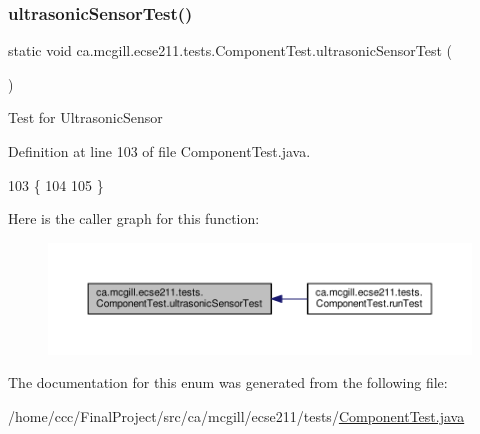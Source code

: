 \subsubsection{\texorpdfstring{ultrasonic\+Sensor\+Test()}{ultrasonicSensorTest()}}
{\footnotesize\ttfamily static void ca.\+mcgill.\+ecse211.\+tests.\+Component\+Test.\+ultrasonic\+Sensor\+Test (\begin{DoxyParamCaption}{ }\end{DoxyParamCaption})\hspace{0.3cm}{\ttfamily [static]}}

Test for Ultrasonic\+Sensor 

Definition at line 103 of file Component\+Test.\+java.


\begin{DoxyCode}
103                                             \{
104 
105   \}
\end{DoxyCode}
Here is the caller graph for this function\+:
\nopagebreak
\begin{figure}[H]
\begin{center}
\leavevmode
\includegraphics[width=350pt]{enumca_1_1mcgill_1_1ecse211_1_1tests_1_1_component_test_a05cd9d95458b11ed57ca001a28fffa7c_icgraph}
\end{center}
\end{figure}


The documentation for this enum was generated from the following file\+:\begin{DoxyCompactItemize}
\item 
/home/ccc/\+Final\+Project/src/ca/mcgill/ecse211/tests/\hyperlink{_component_test_8java}{Component\+Test.\+java}\end{DoxyCompactItemize}
